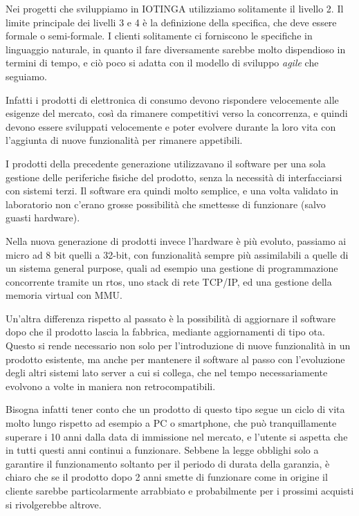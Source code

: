 \documentclass[12pt,a4paper,twoside,titlepage]{book}
\begin{document}
Nei progetti che sviluppiamo in IOTINGA utilizziamo solitamente il livello 2. 
Il limite principale dei livelli 3 e 4 è la definizione della specifica, che 
deve essere formale o semi-formale. I clienti solitamente ci forniscono le specifiche in linguaggio 
naturale, in quanto il fare diversamente sarebbe molto dispendioso in termini di tempo, 
e ciò poco si adatta con il modello di sviluppo \textit{agile} che seguiamo. 

Infatti i prodotti di elettronica di consumo devono rispondere velocemente alle esigenze del mercato, 
così da rimanere competitivi verso la concorrenza, e quindi devono essere sviluppati velocemente e poter 
evolvere durante la loro vita con l'aggiunta di nuove funzionalità per rimanere appetibili. 

I prodotti della precedente generazione utilizzavano il software per una sola gestione
delle periferiche fisiche del prodotto, senza la necessità di interfacciarsi con sistemi
terzi. Il software era quindi molto semplice, e una volta validato in laboratorio 
non c'erano grosse possibilità che smettesse di funzionare (salvo guasti hardware). 

Nella nuova generazione di prodotti invece l'hardware è più evoluto, passiamo ai \gls{micro} 
ad 8 bit quelli a 32-bit, con funzionalità sempre più assimilabili a quelle di un sistema
general purpose, quali ad esempio una gestione di programmazione concorrente tramite un \acrfull{rtos}, uno
stack di rete TCP/IP, ed una gestione della memoria virtual con MMU.

Un'altra differenza rispetto al passato è la possibilità di aggiornare il software dopo
che il prodotto lascia la fabbrica, mediante aggiornamenti di tipo \acrfull{ota}.
Questo si rende necessario non solo per l'introduzione di nuove funzionalità in
un prodotto esistente, ma anche per mantenere il software al passo con l'evoluzione degli
altri sistemi lato server a cui si collega, che nel tempo necessariamente evolvono a volte 
in maniera non retrocompatibili.

Bisogna infatti tener conto che un prodotto di questo tipo segue un ciclo di vita molto lungo
rispetto ad esempio a PC o smartphone, che può tranquillamente superare i 10 anni dalla data di
immissione nel mercato, e l'utente si aspetta che in tutti questi anni continui a funzionare. 
Sebbene la legge obblighi solo a garantire il funzionamento soltanto per il periodo di durata 
della garanzia, è chiaro che se il prodotto dopo 2 anni smette di funzionare come in origine 
il cliente sarebbe particolarmente arrabbiato e probabilmente per i prossimi acquisti si rivolgerebbe altrove. 
\end{document}
